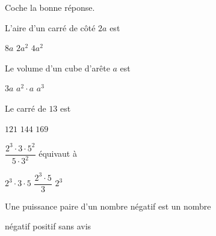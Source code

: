 %
%
	Coche la bonne réponse.\par
	\begin{tasks}
		\task L'aire d'un carré de côté \(2a\) est
		\begin{qcm}
			\choice \(8a\)
			\choice \(2a^2\)
			\correct \(4a^2\)
		\end{qcm}

		\task Le volume d'un cube d'arête \(a\) est
		\begin{qcm}
			\choice \(3a\)
			\choice \(a^2 \cdot a\)
			\correct \(a^3\)
		\end{qcm}

		\task Le carré de \(13\) est
		\begin{qcm}
			\choice \(121\)
			\choice \(144\)
			\correct \(169\)
		\end{qcm}

		\task \(\dfrac{2^3\cdot 3\cdot 5^2}{5\cdot 3^2}\) équivaut à
		\begin{qcm}
			\correct \(2^3\cdot 3\cdot 5\)
			\choice \(\dfrac{2^3\cdot5}{3}\)
			\choice \(2^3\)
		\end{qcm}

		\task Une puissance paire d'un nombre négatif est un nombre
		\begin{qcm}
			\choice négatif
			\correct positif
			\choice sans avis
		\end{qcm}
	\end{tasks}
